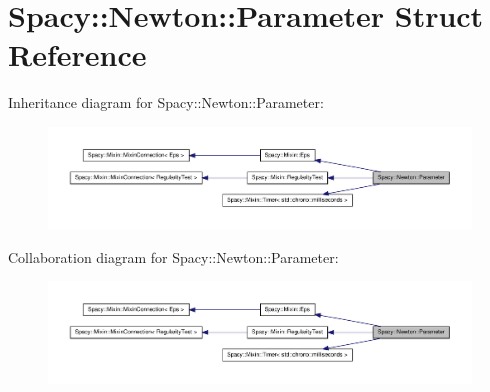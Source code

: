 \hypertarget{structSpacy_1_1Newton_1_1Parameter}{\section{\-Spacy\-:\-:\-Newton\-:\-:\-Parameter \-Struct \-Reference}
\label{structSpacy_1_1Newton_1_1Parameter}
}


\-Inheritance diagram for \-Spacy\-:\-:\-Newton\-:\-:\-Parameter\-:
\nopagebreak
\begin{figure}[H]
\begin{center}
\leavevmode
\includegraphics[width=350pt]{structSpacy_1_1Newton_1_1Parameter__inherit__graph}
\end{center}
\end{figure}


\-Collaboration diagram for \-Spacy\-:\-:\-Newton\-:\-:\-Parameter\-:
\nopagebreak
\begin{figure}[H]
\begin{center}
\leavevmode
\includegraphics[width=350pt]{structSpacy_1_1Newton_1_1Parameter__coll__graph}
\end{center}
\end{figure}
